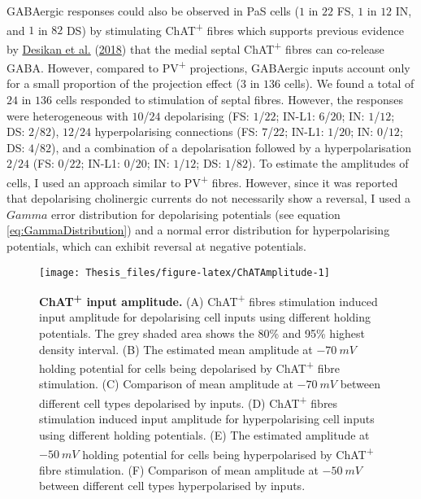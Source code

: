 \documentclass[
  12pt,
  a4paper,
  openany]{book}
\begin{document}
\noindent GABAergic responses could also be observed in PaS cells (\(1\) in \(22\) FS, \(1\) in \(12\) IN, and \(1\) in \(82\) DS) by stimulating ChAT\textsuperscript{+} fibres which supports previous evidence by \protect\hyperlink{ref-desikan_target_2018}{Desikan et al.} (\protect\hyperlink{ref-desikan_target_2018}{2018}) that the medial septal ChAT\textsuperscript{+} fibres can co-release GABA. However, compared to PV\textsuperscript{+} projections, GABAergic inputs account only for a small proportion of the projection effect (\(3\) in \(136\) cells). We found a total of \(24\) in \(136\) cells responded to stimulation of septal fibres. However, the responses were heterogeneous with \(10\)/\(24\) depolarising (FS: \(1\)/\(22\); IN-L1: \(6\)/\(20\); IN: \(1\)/\(12\); DS: \(2\)/\(82\)), \(12/24\) hyperpolarising connections (FS: \(7\)/\(22\); IN-L1: \(1\)/\(20\); IN: \(0\)/\(12\); DS: \(4\)/\(82\)), and a combination of a depolarisation followed by a hyperpolarisation \(2/24\) (FS: \(0\)/\(22\); IN-L1: \(0\)/\(20\); IN: \(1\)/\(12\); DS: \(1\)/\(82\)). To estimate the amplitudes of cells, I used an approach similar to PV\textsuperscript{+} fibres. However, since it was reported that depolarising cholinergic currents do not necessarily show a reversal, I used a \(Gamma\) error distribution for depolarising potentials (see equation \eqref{eq:GammaDistribution}) and a normal error distribution for hyperpolarising potentials, which can exhibit reversal at negative potentials.




\begin{figure}[htb]

{\centering \texttt{[image: Thesis\_files/figure-latex/ChATAmplitude-1]} 

}

\caption[ChAT\textsuperscript{+} input amplitude]{\textbf{ChAT\textsuperscript{+} input amplitude.} (A) ChAT\textsuperscript{+} fibres stimulation induced input amplitude for depolarising cell inputs using different holding potentials. The grey shaded area shows the 80\% and 95\% highest density interval. (B) The estimated mean amplitude at \(-70\ mV\) holding potential for cells being depolarised by ChAT\textsuperscript{+} fibre stimulation. (C) Comparison of mean amplitude at \(-70\ mV\) between different cell types depolarised by inputs. (D) ChAT\textsuperscript{+} fibres stimulation induced input amplitude for hyperpolarising cell inputs using different holding potentials. (E) The estimated amplitude at \(-50\ mV\) holding potential for cells being hyperpolarised by ChAT\textsuperscript{+} fibre stimulation. (F) Comparison of mean amplitude at \(-50\ mV\) between different cell types hyperpolarised by inputs.}\label{fig:ChATAmplitude}
\end{figure}
\end{document}

